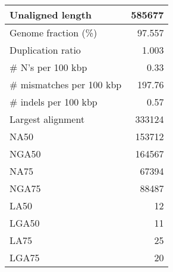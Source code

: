 \documentclass[12pt,a4paper]{article}
\begin{document}
\begin{table}[ht]
\begin{center}
\begin{tabular}{|l*{1}{|r}|}
Unaligned length & 585677 \\ \hline
Genome fraction (\%) & 97.557 \\ \hline
Duplication ratio & 1.003 \\ \hline
\# N's per 100 kbp & 0.33 \\ \hline
\# mismatches per 100 kbp & 197.76 \\ \hline
\# indels per 100 kbp & 0.57 \\ \hline
Largest alignment & 333124 \\ \hline
NA50 & 153712 \\ \hline
NGA50 & 164567 \\ \hline
NA75 & 67394 \\ \hline
NGA75 & 88487 \\ \hline
LA50 & 12 \\ \hline
LGA50 & 11 \\ \hline
LA75 & 25 \\ \hline
LGA75 & 20 \\ \hline
\end{tabular}
\end{center}
\end{table}
\end{document}
